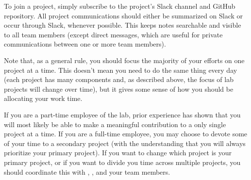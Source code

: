 \documentclass{tufte-book} %
\begin{document}
{}

\noindent To join a project, simply subscribe to the project's Slack channel and
GitHub repository.  All project communications should either be
summarized on Slack or occur through Slack, whenever possible.  This
keeps notes searchable and visible to all team members (except direct
messages, which are useful for private communications between one or
more team members).

Note that, as a general rule, you should focus the majority of your
efforts on one project at a time.  This doesn't mean you need to do
the same thing every day (each project has many components and, as
described above, the focus of lab projects will change over time), but
it gives some sense of how you should be allocating your work time.

If you are a part-time employee of the lab, prior experience has shown
that you will most likely be able to make a meaningful contribution to
a only single project at a time.  If you are a full-time employee, you
may choose to devote some of your time to a secondary project (with
the understanding that you will always prioritize your primary
project).  If you want to change which project is your primary
project, or if you want to divide you time across multiple projects,
you should coordinate this with \director, \coordinator, and your team
members.


\label{sec: scheduling}
\end{document}
